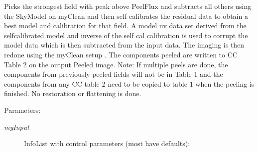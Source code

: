 Picks the strongest field with peak above Peel\-Flux and subtracts all others using the Sky\-Model on my\-Clean and then self calibrates the residual data to obtain a best model and calibration for that field. A model uv data set derived from the selfcalibrated model and inverse of the self cal calibration is used to corrupt the model data which is then subtracted from the input data. The imaging is then redone using the my\-Clean setup . The components peeled are written to CC Table 2 on the output Peeled image. Note: If multiple peels are done, the components from previously peeled fields will not be in Table 1 and the components from any CC table 2 need to be copied to table 1 when the peeling is finished. No restoration or flattening is done. \begin{Desc}
\item[Parameters:]
\begin{description}
\item[{\em my\-Input}]Info\-List with control parameters (most have defaults): \begin{itemize}

\end{itemize}
\end{description}
\end{Desc}
